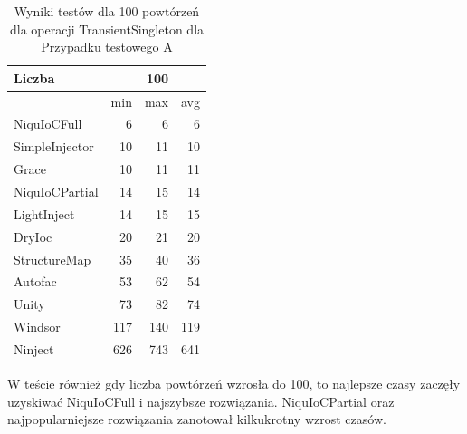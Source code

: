 \documentclass[12pt]{article}
\begin{document}
\begin{table}[H]
\captionsetup{belowskip=0pt,aboveskip=0pt}
\begin{center}
\begin{small}
	\begin{tabular}{ | l | r r r | }
    		\hline
Liczba & & 100 & \\ \hline
 & min & max & avg \\ \hline
NiquIoCFull & 6 & 6 & 6 \\ \hline
SimpleInjector & 10 & 11 & 10 \\ \hline
Grace & 10 & 11 & 11 \\ \hline
NiquIoCPartial & 14 & 15 & 14 \\ \hline
LightInject & 14 & 15 & 15 \\ \hline
DryIoc & 20 & 21 & 20 \\ \hline
StructureMap & 35 & 40 & 36 \\ \hline
Autofac & 53 & 62 & 54 \\ \hline
Unity & 73 & 82 & 74 \\ \hline
Windsor & 117 & 140 & 119 \\ \hline
Ninject & 626 & 743 & 641 \\ \hline
  	\end{tabular}
\end{small}
\end{center}
\caption{Wyniki testów dla 100 powtórzeń dla operacji TransientSingleton dla Przypadku testowego A}
\label{TestCaseA_TransientSingleton100}
\end{table}
W teście również gdy liczba powtórzeń wzrosła do 100, to najlepsze czasy zaczęły uzyskiwać NiquIoCFull i najszybsze rozwiązania. NiquIoCPartial oraz najpopularniejsze rozwiązania zanotował kilkukrotny wzrost czasów.
\\ \\
\end{document}
